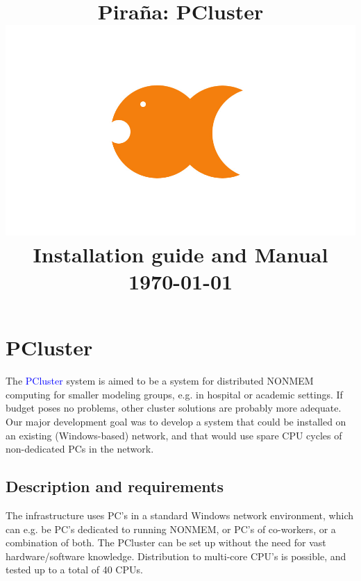\documentclass[a4,11pt]{report} \usepackage[pdftex]{graphicx}
\begin{document}
\title{\textbf{\textcolor{PiranaOrange}{Pira\~na: PCluster}}\\ \vspace{15pt}
\includegraphics[scale=0.12]{images/pirana_logo.jpg} \\ \vspace{15pt}
\scriptsize Installation guide and Manual \\
\vspace{5pt} \scriptsize {\today} \\
\date{}}
\maketitle

\tableofcontents

\chapter{PCluster} The \textcolor{Blue}{PCluster} system is aimed to
be a system for distributed NONMEM computing for smaller modeling
groups, e.g. in hospital or academic settings. If budget poses no
problems, other cluster solutions are probably more adequate. Our major development goal
was to develop a system that could be installed on an existing
(Windows-based) network, and that would use spare CPU cycles of
non-dedicated PCs in the network.

\section{Description and requirements} The infrastructure uses
PC's in a standard Windows network environment, which can e.g. be PC's
dedicated to running NONMEM, or PC's of co-workers, or a combination
of both. The PCluster can be set up without the need for vast
hardware/software knowledge. Distribution to multi-core CPU's is
possible, and tested up to a total of 40 CPUs.
\end{document}
